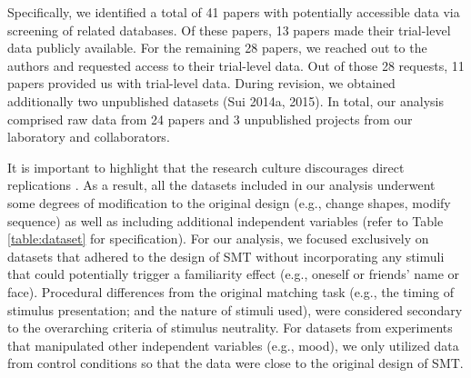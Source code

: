 \documentclass[sn-apa]{sn-jnl}%
\theoremstyle{thmstyleone}%
\theoremstyle{thmstyletwo}%
\theoremstyle{thmstylethree}%
\begin{document}
Specifically, we identified a total of 41 papers with potentially accessible data via screening of related databases. Of these papers, 13 papers made their trial-level data publicly available. For the remaining 28 papers, we reached out to the authors and requested access to their trial-level data. Out of those 28 requests, 11 papers provided us with trial-level data. During revision, we obtained additionally two unpublished datasets (Sui 2014a, 2015). In total, our analysis comprised raw data from 24 papers and 3 unpublished projects from our laboratory and collaborators. 

 It is important to highlight that the research culture discourages direct replications \parencite{makel2012replications}. As a result, all the datasets included in our analysis underwent some degrees of modification to the original design (e.g., change shapes, modify sequence) as well as including additional independent variables (refer to Table \ref{table:dataset} for specification). For our analysis, we focused exclusively on datasets that adhered to the design of SMT without incorporating any stimuli that could potentially trigger a familiarity effect (e.g., oneself or friends’ name or face). Procedural differences from the original matching task (e.g., the timing of stimulus presentation; and the nature of stimuli used), were considered secondary to the overarching criteria of stimulus neutrality. For datasets from experiments that manipulated other independent variables (e.g., mood), we only utilized data from control conditions so that the data were close to the original design of SMT.  
 
\end{document}
